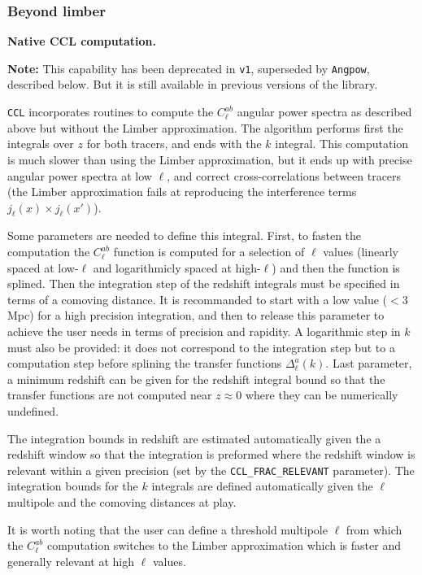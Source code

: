\documentclass[\docopts]{\docclass}
\newcommand{\ccl}{{\tt CCL}\xspace}
\begin{document}
\subsubsection*{Beyond limber}

{\bf Native CCL computation.}

{\bf Note:} This capability has been deprecated in {\tt v1}, superseded by {\tt Angpow}, described below. But it is still available in previous versions of the library.

\ccl incorporates routines to compute the $C^{ab}_\ell$ angular power spectra as described above but without the Limber approximation. The algorithm performs first the integrals over $z$ for both tracers, and ends with the $k$ integral. This computation is much slower than using the Limber approximation, but it ends up with precise angular power spectra at low $\ell$, and correct cross-correlations between tracers (the Limber approximation fails at reproducing the interference terms $j_\ell(x)\times j_\ell(x')$).

Some parameters are needed to define this integral. First, to fasten the computation the $C^{ab}_\ell$ function is computed for a selection of $\ell$ values (linearly spaced at low-$\ell$ and logarithmicly spaced at high-$\ell$) and then the function is splined. Then the integration step of the redshift integrals must be specified in terms of a comoving distance. It is recommanded to start with a low value ($<3$\,Mpc) for a high precision integration, and then to release this parameter to achieve the user needs in terms of precision and rapidity. A logarithmic step in $k$ must also be provided: it does not correspond to the integration step but to a computation step before splining the transfer functions $\Delta^a_\ell(k)$. Last parameter, a minimum redshift can be given for the redshift integral bound so that the transfer functions are not computed near $z\approx 0$ where they can be numerically undefined.

The integration bounds in redshift are estimated automatically given the a redshift window so that the integration is preformed where the redshift window is relevant within a given precision (set by the \texttt{CCL\_FRAC\_RELEVANT} parameter). The integration bounds for the $k$ integrals are defined automatically given the $\ell$ multipole and the comoving distances at play.

It is worth noting that the user can define a threshold multipole $\ell$ from which the $C^{ab}_\ell$ computation switches to the Limber approximation which is faster and generally relevant at high $\ell$ values.
\end{document}
